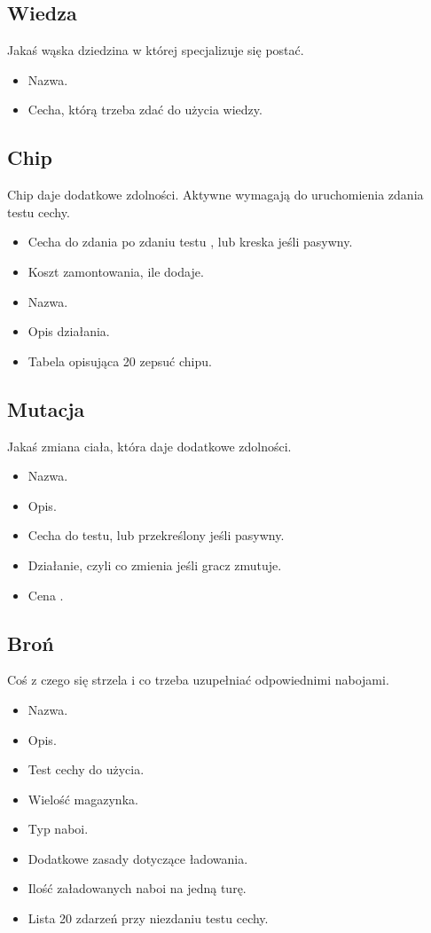 \subsection{Wiedza}
Jakaś wąska dziedzina w której specjalizuje się postać.
\begin{itemize}
 \item Nazwa.
 \item Cecha, którą trzeba zdać do użycia wiedzy.
\end{itemize}

\subsection{Chip}
Chip daje dodatkowe zdolności.
Aktywne wymagają do uruchomienia zdania testu cechy.
\begin{itemize}
 \item Cecha do zdania po zdaniu testu \abnkp, lub kreska jeśli pasywny.
 \item Koszt zamontowania, ile \abnkp dodaje.
 \item Nazwa.
 \item Opis działania.
 \item Tabela opisująca 20 zepsuć chipu.
\end{itemize}

\subsection{Mutacja}
Jakaś zmiana ciała, która daje dodatkowe zdolności.
\begin{itemize}
 \item Nazwa.
 \item Opis.
 \item Cecha do testu, lub przekreślony jeśli pasywny.
 \item Działanie, czyli co zmienia jeśli gracz zmutuje.
 \item Cena \abnkp. 
\end{itemize}

\subsection{Broń}
Coś z czego się strzela i co trzeba uzupełniać odpowiednimi nabojami.
\begin{itemize}
 \item Nazwa.
 \item Opis.
 \item Test cechy do użycia.
 \item Wielość magazynka.
 \item Typ naboi.
 \item Dodatkowe zasady dotyczące ładowania.
 \item Ilość załadowanych naboi na jedną turę.
 \item Lista 20 zdarzeń przy niezdaniu testu cechy.
\end{itemize}











